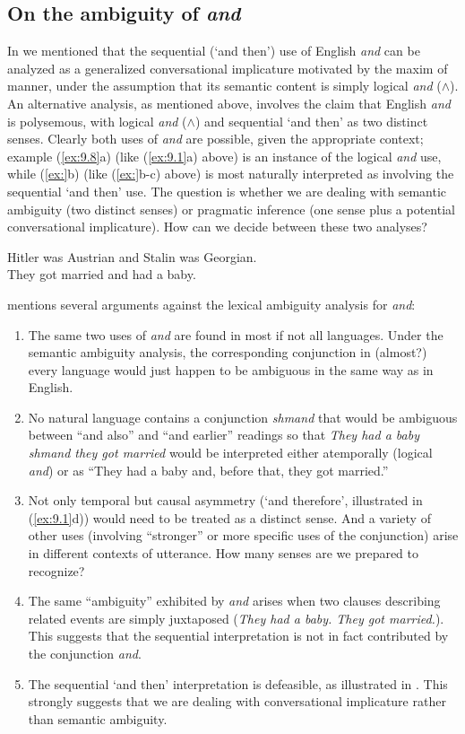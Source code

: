 \subsection{On the ambiguity of \textit{and}}\label{sec:9.2.1} 

In  we mentioned that the sequential (‘and then’) use of English \textit{and} can be analyzed as a generalized conversational implicature motivated by the maxim of manner, under the assumption that its semantic content is simply logical \textit{and} ($\wedge$). An alternative analysis, as mentioned above, involves the claim that English \textit{and} is polysemous, with logical \textit{and} ($\wedge$) and sequential ‘and then’ as two distinct senses. Clearly both uses of \textit{and} are possible, given the appropriate context; example (\ref{ex:9.8}a) (like (\ref{ex:9.1}a) above) is an instance of the logical \textit{and} use, while (\ref{ex:}b) (like (\ref{ex:}b-c) above) is most naturally interpreted as involving the sequential ‘and then’ use. The question is whether we are dealing with semantic ambiguity (two distinct senses) or pragmatic inference (one sense plus a potential conversational implicature). How can we decide between these two analyses?


\ea \label{ex:9.8}
\ea Hitler was Austrian and Stalin was Georgian.\\
\ex They got married and had a baby.
                       \z
\z


\citet{Horn2004} mentions several arguments against the lexical ambiguity analysis for \textit{and}:


\begin{enumerate}[label=\roman*.]
\item The same two uses of \textit{and} are found in most if not all languages. Under the semantic ambiguity analysis, the corresponding conjunction in (almost?) every language would just happen to be ambiguous in the same way as in English.
\item No natural language contains a conjunction \textit{shmand} that would be ambiguous between “and also” and “and earlier” readings so that \textit{They had a baby shmand they got married} would be interpreted either atemporally (logical \textit{and}) or as “They had a baby and, before that, they got married.”
\item Not only temporal but causal asymmetry (‘and therefore’, illustrated in (\ref{ex:9.1}d)) would need to be treated as a distinct sense. And a variety of other uses (involving “stronger” or more specific uses of the conjunction) arise in different contexts of utterance. How many senses are we prepared to recognize?
\item The same “ambiguity” exhibited by \textit{and} arises when two clauses describing related events are simply juxtaposed (\textit{They had a baby. They got married.}). This suggests that the sequential interpretation is not in fact contributed by the conjunction \textit{and}.
\item The sequential ‘and then’ interpretation is defeasible, as illustrated in . This strongly suggests that we are dealing with conversational implicature rather than semantic ambiguity.
\end{enumerate}

